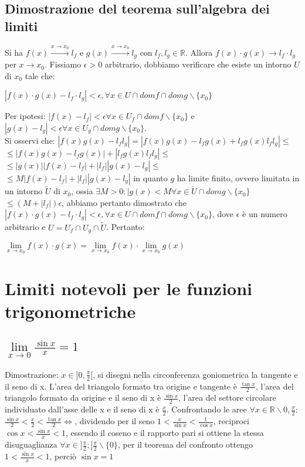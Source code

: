 \subsection{Dimostrazione del teorema sull'algebra dei limiti}
Si ha $f(x)\xrightarrow{x\rightarrow x_0}l_f$ e $g(x)\xrightarrow{x\rightarrow x_0}l_g$ con $l_f,l_g\in\mathbb{R}$. Allora $f(x)\cdot g(x)\rightarrow l_f
\cdot l_g$ per $x\rightarrow x_0$.
Fissiamo $\epsilon>0$ arbitrario, dobbiamo verificare che esiste un intorno $U$ di $x_0$ tale che:
\begin{center}
$|f(x)\cdot g(x)-l_f\cdot l_g|<\epsilon, \forall x\in U\cap domf\cap domg\backslash\{x_0\}$
\end{center}
Per ipotesi: $|f(x)-l_f|<\epsilon\forall x\in U_f\cap domf\backslash\{x_0\}$ e $|g(x)-l_g|<\epsilon\forall x\in U_g\cap domg\backslash\{x_0\}$.\\
Si osservi che: $|f(x)g(x)-l_fl_g|=|f(x)g(x)-l_fg(x)+l_fg(x)l_fl_g|\le$\\
$\le |f(x)g(x)-l_fg(x)|+|l_fg(x)l_fl_g|\le$\\
$\le |g(x)||f(x)-l_f|+|l_f||g(x)-l_g|\le$\\
$\le M|f(x)-l_f|+|l_f||g(x)-l_g|$ in quanto $g$ ha limite finito, ovvero limitata in un intorno $\tilde{U}$ di $x_0$, ossia $\exists M>0:|g(x)<M\forall x\in\tilde{U}\cap 
domg\backslash\{x_0\}$\\
$\le (M+|l_f|)\epsilon$, abbiamo pertanto dimostrato che $|f(x)\cdot g(x)-l_f\cdot l_g|<\epsilon, \forall x\in U\cap domf\cap domg\backslash\{x_0\}$, dove $\epsilon$ \`e 
un numero arbitrario e $U=U_f\cap U_g\cap\tilde{U}$. Pertanto:
\begin{center}
$\lim\limits_{x\rightarrow x_0}f(x)\cdot g(x)=\lim\limits_{x\rightarrow x_0}f(x)\cdot \lim\limits_{x\rightarrow x_0}g(x)$
\end{center}
\section{Limiti notevoli per le funzioni trigonometriche}
\subsection{$\lim\limits_{x\rightarrow 0} \frac{\sin x}{x}=1$}
Dimostrazione: $x\in ]0,\frac{\pi}{2}[$, si disegni nella circonferenza goniometrica la tangente e il seno di x. L'area del triangolo formato tra origine e tangente \`e
 $\frac{\tan x}{2}$, l'area del triangolo formato da origine e il seno di x \`e $\frac{\sin x}{2}$, l'area del settore circolare individuato dall'asse delle x e il seno di x
 \`e $\frac{x}{2}$. Confrontando le aree $\forall x\in \mathbb{R}\backslash 0,\frac{\pi}{2}$: $\frac{\sin x}{2}<\frac{x}{2}<\frac{\tan x}{2}\Leftrightarrow$, dividendo per il seno 
 $1<\frac{x}{\sin x}<\frac{1}{\cos x}$, reciproci $\cos x<\frac{\sin x}{x}<1$, essendo il coseno e il rapporto pari si ottiene la stessa disuguaglianza $\forall x\in ]\frac{\pi}{2};]\frac{\pi}{2}\backslash\{0\}$, per il teorema del confronto ottengo $1<\frac{\sin x}{x}<1$, perci\`o $\sin x=1$

